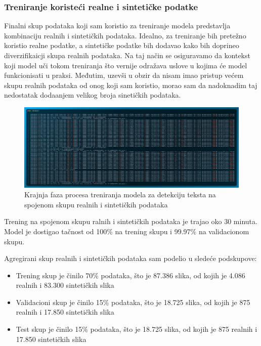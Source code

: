 \documentclass[a4paper,12pt]{article}
\begin{document}
	\subsubsection{Treniranje koristeći realne i sintetičke podatke}
	Finalni skup podataka koji sam koristio za treniranje modela predstavlja kombinaciju realnih i sintetičkih podataka. Idealno, za treniranje bih pretežno koristio realne podatke, a sintetičke podatke bih dodavao kako bih doprineo diverzifikaicji skupa realnih podataka. Na taj način se osiguravamo da kontekst koji model uči tokom treniranja što vernije odražava uslove u kojima će model funkcionisati u praksi. Međutim, uzevši u obzir da nisam imao pristup većem skupu realnih podataka od onog koji sam koristio, morao sam da nadoknadim taj nedostatak dodaanjem velikog broja sinetičkih podataka.
	
	\begin{figure}[H]
		\centering
		\includegraphics[width=\textwidth]{assets/train-code-real-and-synthetic-data.png}
		\caption{Krajnja faza procesa treniranja modela za detekciju teksta na spojenom skupu realnih i sintetičkih podataka}
		\label{fig:train-code-real-and-synthetic-data}
	\end{figure}
	
	Trening na spojenom skupu ralnih i sintetičkih podataka je trajao oko 30 minuta. Model je dostigao tačnost od 100\% na trening skupu i 99.97\% na validacionom skupu.\newline
	
	Agregirani skup realnih i sintetičkih podataka sam podelio u sledeće podskupove:
	\begin{itemize}
		\item Trening skup je činilo 70\% podataka, što je 87.386 slika, od kojih je 4.086 realnih i 83.300 sintetičkih slika
		\item Validacioni skup je činilo 15\% podataka, što je 18.725 slika, od kojih je 875 realnih i 17.850 sintetičkih slika
		\item Test skup je činilo 15\% podataka, što je 18.725 slika, od kojih je 875 realnih i 17.850 sintetičkih slika
	\end{itemize}
\end{document}
